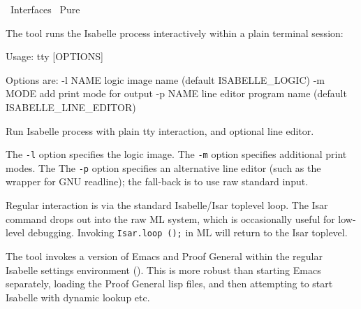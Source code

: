 %
\begin{isabellebody}%
\def\isabellecontext{Interfaces}%
%
\isadelimtheory
\isanewline
\isanewline
%
\endisadelimtheory
%
\isatagtheory
{}\isamarkupfalse%
\ Interfaces\isanewline
{}\ Pure\isanewline
{}%
\endisatagtheory
{\isafoldtheory}%
%
\isadelimtheory
%
\endisadelimtheory
%
\isamarkuptrue%
%
\isamarkuptrue%
%
\begin{isamarkuptext}%
The \hypertarget{tool.tty}{\hyperlink{tool.tty}{\mbox{}}} tool runs the Isabelle process interactively
  within a plain terminal session:
\begin{ttbox}
Usage: tty [OPTIONS]

  Options are:
    -l NAME      logic image name (default ISABELLE_LOGIC)
    -m MODE      add print mode for output
    -p NAME      line editor program name (default ISABELLE_LINE_EDITOR)

  Run Isabelle process with plain tty interaction, and optional line editor.
\end{ttbox}

  The \verb|-l| option specifies the logic image.  The
  \verb|-m| option specifies additional print modes.  The The
  \verb|-p| option specifies an alternative line editor (such
  as the \hypertarget{executable.rlwrap}{\hyperlink{executable.rlwrap}{\mbox{}}} wrapper for GNU readline); the
  fall-back is to use raw standard input.

  Regular interaction is via the standard Isabelle/Isar toplevel loop.
  The Isar command \hyperlink{command.exit}{\mbox{}} drops out into the raw ML system,
  which is occasionally useful for low-level debugging.  Invoking \verb|Isar.loop|~\verb|();| in ML will return to the Isar toplevel.%
\end{isamarkuptext}%
\isamarkuptrue%
%
\isamarkuptrue%
%
\begin{isamarkuptext}%
The \hypertarget{tool.emacs}{\hyperlink{tool.emacs}{\mbox{}}} tool invokes a version of Emacs and Proof
  General within the regular Isabelle settings environment
  ().  This is more robust than starting Emacs
  separately, loading the Proof General lisp files, and then
  attempting to start Isabelle with dynamic \hyperlink{setting.PATH}{\mbox{}} lookup
  etc.


\end{isamarkuptext}
\end{isabellebody}
